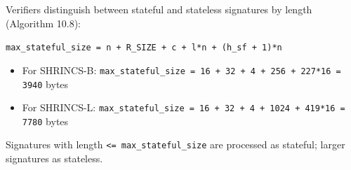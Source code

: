 Verifiers distinguish between stateful and stateless signatures by length (Algorithm 10.8):
\begin{center}
    \texttt{max\_stateful\_size = n + R\_SIZE + c + l*n + (h\_sf + 1)*n}
\end{center}
\begin{itemize}
    \item For SHRINCS-B: \texttt{max\_stateful\_size = 16 + 32 + 4 + 256 + 227*16 = 3940} bytes
    \item For SHRINCS-L: \texttt{max\_stateful\_size = 16 + 32 + 4 + 1024 + 419*16 = 7780} bytes
\end{itemize}

Signatures with length \texttt{<= max\_stateful\_size} are processed as stateful; larger signatures as stateless.